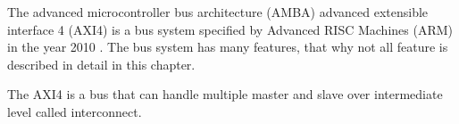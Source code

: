  
The  advanced microcontroller bus architecture (AMBA) advanced extensible interface 4 (AXI4) is a bus system specified by Advanced RISC Machines (ARM) in the year 2010 \cite{6129797}. The bus system has many features, that why not all feature is described in detail in this chapter.

The AXI4 is a bus that can handle multiple master and slave over intermediate level called interconnect.  